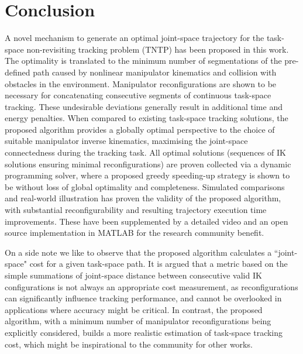 \documentclass[letterpaper, 10 pt, conference]{ieeeconf}  %
\begin{document}
\section{Conclusion}\label{section:conclusion}
A novel mechanism to generate an optimal joint-space trajectory for the task-space non-revisiting tracking problem (TNTP) has been proposed in this work. 
The optimality is translated to the minimum number of segmentations of the pre-defined path caused by nonlinear manipulator kinematics and collision with obstacles in the environment. 
Manipulator reconfigurations are shown to be necessary for concatenating consecutive segments of continuous task-space tracking. These undesirable deviations generally result in additional time and energy penalties.
When compared to existing task-space tracking solutions, the proposed algorithm provides a globally optimal perspective to the choice of suitable manipulator inverse kinematics, 
maximising the joint-space connectedness during the tracking task. 
All optimal solutions (sequences of IK solutions ensuring minimal reconfigurations) are proven collected via a dynamic programming solver, where a proposed greedy speeding-up strategy is shown to be without loss of global optimality and completeness. 
Simulated comparisons and real-world illustration has proven the validity of the proposed algorithm, with substantial reconfigurability and resulting trajectory execution time improvements. 
These have been supplemented by a detailed video and an open source implementation in MATLAB for the research community benefit. 

On a side note we like to observe that the proposed algorithm calculates a ``joint-space" cost for a given task-space path. 
It is argued that a metric based on the simple summations of joint-space distance between consecutive valid IK configurations is not always an 
appropriate cost measurement, as reconfigurations can significantly influence tracking performance, and cannot be overlooked in applications where accuracy might be critical. 
In contrast, the proposed algorithm, with a minimum number of manipulator reconfigurations being explicitly considered, builds a more realistic estimation of task-space tracking cost, which might be inspirational to the community for other works. 








\newpage
\end{document}
